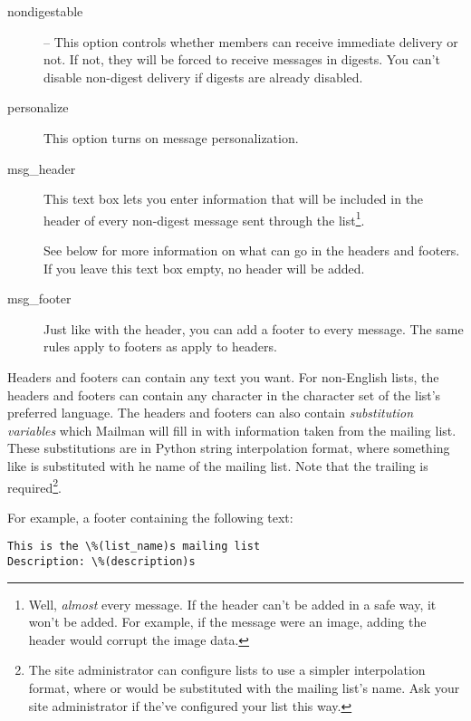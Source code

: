\documentclass{howto}
\begin{document}
\begin{description}
\item[nondigestable] --
    This option controls whether members can receive immediate
    delivery or not.  If not, they will be forced to receive messages
    in digests.  You can't disable non-digest delivery if digests are
    already disabled.

\item[personalize]
    This option turns on message personalization.

\item[msg_header]
    This text box lets you enter information that will be included in
    the header of every non-digest message sent through the
    list\footnote{Well, \emph{almost} every message.  If the header
    can't be added in a safe way, it won't be added.  For example, if
    the message were an image, adding the header would corrupt the
    image data.}.

    See below for more information on what can go in the headers and
    footers.  If you leave this text box empty, no header will be
    added.

\item[msg_footer]
    Just like with the header, you can add a footer to every message.
    The same rules apply to footers as apply to headers.
\end{description}

Headers and footers can contain any text you want.  For non-English
lists, the headers and footers can contain any character in the
character set of the list's preferred language.  The headers and
footers can also contain \emph{substitution variables} which Mailman
will fill in with information taken from the mailing list.  These
substitutions are in Python string interpolation format, where
something like  is substituted with he name of
the mailing list.  Note that the trailing  is
required\footnote{The site administrator can configure lists to use a
simpler interpolation format, where  or
 would be substituted with the mailing list's
name.  Ask your site administrator if the've configured your list this
way.}.

For example, a footer containing the following text:

\begin{verbatim}
This is the \%(list_name)s mailing list
Description: \%(description)s
\end{verbatim}
\end{document}
